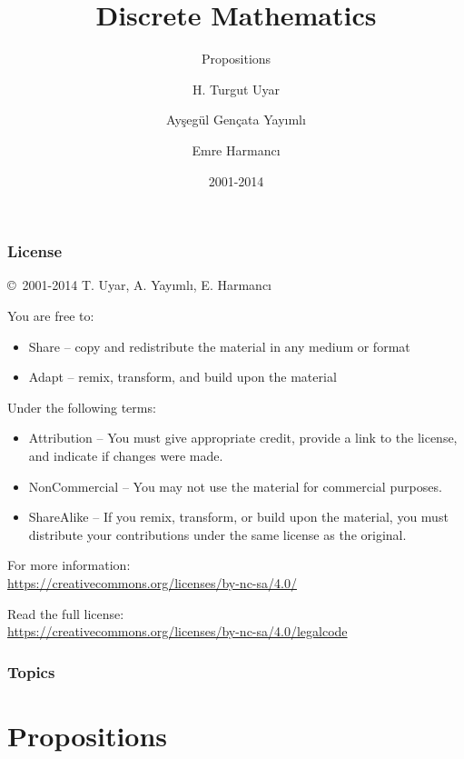 \documentclass[dvipsnames]{beamer}
\title{Discrete Mathematics}
\subtitle{Propositions}
\author{H. Turgut Uyar \and Ayşegül Gençata Yayımlı \and Emre Harmancı}
\date{2001-2014}
\begin{document}
\begin{frame}
  \titlepage
\end{frame}

\begin{frame}
  \frametitle{License}

  \hfill
  \copyright~2001-2014 T. Uyar, A. Yayımlı, E. Harmancı

  \vfill
  \begin{footnotesize}
    You are free to:
    \begin{itemize}
      \itemsep0em
      \item Share -- copy and redistribute the material in any medium or format
      \item Adapt -- remix, transform, and build upon the material
    \end{itemize}

    Under the following terms:
    \begin{itemize}
      \itemsep0em
      \item Attribution -- You must give appropriate credit, provide a link to
        the license, and indicate if changes were made.

      \item NonCommercial -- You may not use the material for commercial
        purposes.

      \item ShareAlike -- If you remix, transform, or build upon the material,
        you must distribute your contributions under the same license as the
        original.
    \end{itemize}
  \end{footnotesize}

  \begin{small}
    For more information:\\
    \url{https://creativecommons.org/licenses/by-nc-sa/4.0/}

    \smallskip
    Read the full license:\\
    \url{https://creativecommons.org/licenses/by-nc-sa/4.0/legalcode}
  \end{small}
\end{frame}

\begin{frame}
  \frametitle{Topics}
  \tableofcontents
\end{frame}

\section{Propositions}
\end{document}
